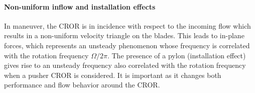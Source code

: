 \paragraph{Non-uniform inflow and installation effects}

In maneuver, the CROR is in incidence with respect to the incoming flow
which results in a non-uniform velocity triangle on the blades.
This leads to in-plane forces, which represents an unsteady phenomenon
whose frequency is correlated with the rotation frequency $\Omega / 2 \pi$.
The presence of a pylon (installation effect) gives rise to an unsteady frequency
also correlated with the rotation frequency when a pusher CROR is considered.
It is important as it changes both performance and flow behavior around the CROR.
